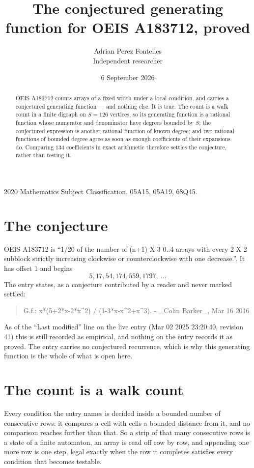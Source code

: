 \documentclass[11pt,a4paper]{article}
\title{The conjectured generating function for OEIS A183712, proved}
\author{Adrian Perez Fontelles\\ \small Independent researcher}
\date{6 September 2026}
\theoremstyle{plain}
\theoremstyle{definition}
\begin{document}
\maketitle

\begin{abstract}
OEIS A183712 counts arrays of a fixed width under a local condition, and carries a conjectured
generating function --- and nothing else. It is true. The count is a walk count in a finite
digraph on $S=126$ vertices, so its generating function is a rational function whose numerator
and denominator have degrees bounded by $S$; the conjectured expression is another rational
function of known degree; and two rational functions of bounded degree agree as soon as enough
coefficients of their expansions do. Comparing $134$ coefficients in exact arithmetic
therefore settles the conjecture, rather than testing it.
\end{abstract}

\noindent\small 2020 Mathematics Subject Classification. 05A15, 05A19, 68Q45.\normalsize

\section{The conjecture}

OEIS A183712 is ``1/20 of the number of (n+1) X 3 0..4 arrays with every 2 X 2 subblock strictly increasing clockwise or counterclockwise with one decrease.''. It has offset $1$ and begins
\[
5, 17, 54, 174, 559, 1797,\ \dots
\]
The entry states, as a conjecture contributed by a reader and never marked settled:
\begin{quote}
G.f.: x*(5+2*x-2*x\^{}2) / (1-3*x-x\^{}2+x\^{}3). - \_Colin Barker\_, Mar 16 2016
\end{quote}
As of the ``Last modified'' line on the live entry (Mar 02 2025 23:20:40, revision 41) this is still
recorded as empirical, and nothing on the entry records it as proved. The entry carries no
conjectured recurrence, which is why this generating function is the whole of what is open
here.

\section{The count is a walk count}

Every condition the entry names is decided inside a bounded number of consecutive rows: it
compares a cell with cells a bounded distance from it, and no comparison reaches further than
that. So a strip of that many consecutive rows is a state of a finite automaton, an array is
read off row by row, and appending one more row is one step, legal exactly when the row it
completes satisfies every condition that becomes testable.
\end{document}
